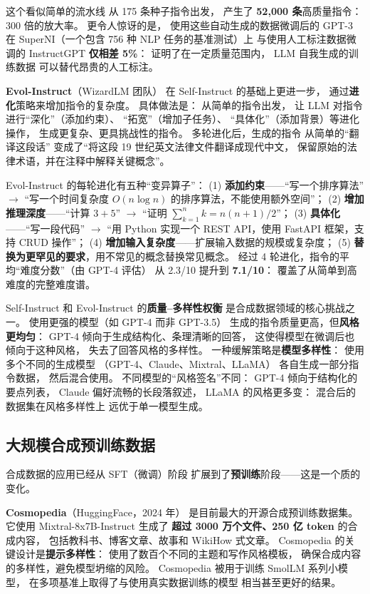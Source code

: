 这个看似简单的流水线
从 175 条种子指令出发，
产生了 \textbf{52,000 条}高质量指令：
300 倍的放大率。
更令人惊讶的是，
使用这些自动生成的数据微调后的 GPT-3
在 SuperNI（一个包含 756 种 NLP 任务的基准测试）上
与使用人工标注数据微调的 InstructGPT
\textbf{仅相差 5\%}：
证明了在一定质量范围内，
LLM 自我生成的训练数据
可以替代昂贵的人工标注。

\textbf{Evol-Instruct}（WizardLM 团队）
在 Self-Instruct 的基础上更进一步，
通过\textbf{进化}策略来增加指令的复杂度。
具体做法是：
从简单的指令出发，
让 LLM 对指令进行“深化”（添加约束）、
“拓宽”（增加子任务）、
“具体化”（添加背景）等进化操作，
生成更复杂、更具挑战性的指令。
多轮进化后，生成的指令
从简单的“翻译这段话”
变成了“将这段 19 世纪英文法律文件翻译成现代中文，
保留原始的法律术语，并在注释中解释关键概念”。

Evol-Instruct 的每轮进化有五种“变异算子”：
(1) \textbf{添加约束}——“写一个排序算法” $\to$ “写一个时间复杂度 $O(n\log n)$ 的排序算法，不能使用额外空间”；
(2) \textbf{增加推理深度}——“计算 $3 + 5$” $\to$ “证明 $\sum_{k=1}^{n} k = n(n+1)/2$”；
(3) \textbf{具体化}——“写一段代码” $\to$ “用 Python 实现一个 REST API，使用 FastAPI 框架，支持 CRUD 操作”；
(4) \textbf{增加输入复杂度}——扩展输入数据的规模或复杂度；
(5) \textbf{替换为更罕见的要求}，用不常见的概念替换常见概念。
经过 4 轮进化，指令的平均“难度分数”（由 GPT-4 评估）
从 2.3/10 提升到 \textbf{7.1/10}：
覆盖了从简单到高难度的完整难度谱。

Self-Instruct 和 Evol-Instruct 的\textbf{质量--多样性权衡}
是合成数据领域的核心挑战之一。
使用更强的模型（如 GPT-4 而非 GPT-3.5）
生成的指令质量更高，但\textbf{风格更均匀}：
GPT-4 倾向于生成结构化、条理清晰的回答，
这使得模型在微调后也倾向于这种风格，
失去了回答风格的多样性。
一种缓解策略是\textbf{模型多样性}：
使用多个不同的生成模型
（GPT-4、Claude、Mixtral、LLaMA）
各自生成一部分指令数据，
然后混合使用。
不同模型的“风格签名”不同：
GPT-4 倾向于结构化的要点列表，
Claude 偏好流畅的长段落叙述，
LLaMA 的风格更多变：
混合后的数据集在风格多样性上
远优于单一模型生成。

\subsection{大规模合成预训练数据}

合成数据的应用已经从 SFT（微调）阶段
扩展到了\textbf{预训练}阶段——这是一个质的变化。

\textbf{Cosmopedia}（HuggingFace，2024 年）
是目前最大的开源合成预训练数据集。
它使用 Mixtral-8x7B-Instruct 生成了
\textbf{超过 3000 万个文件、250 亿 token} 的合成内容，
包括教科书、博客文章、故事和 WikiHow 式文章。
Cosmopedia 的关键设计是\textbf{提示多样性}：
使用了数百个不同的主题和写作风格模板，
确保合成内容的多样性，避免模型坍缩的风险。
Cosmopedia 被用于训练 SmolLM 系列小模型，
在多项基准上取得了与使用真实数据训练的模型
相当甚至更好的结果。

